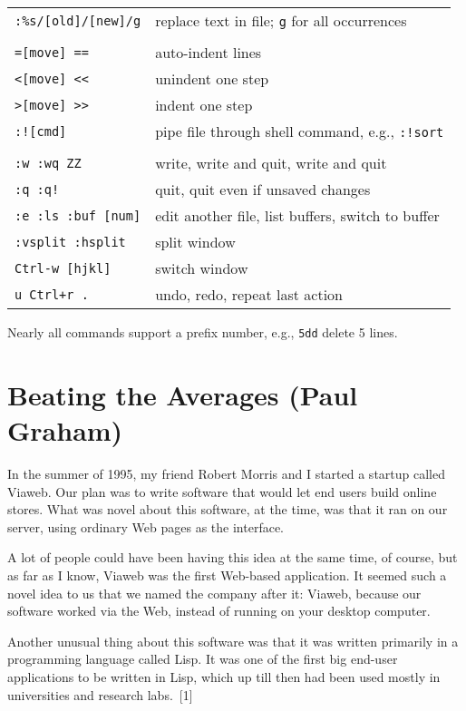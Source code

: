 \documentclass[10pt,twoside,openright]{memoir}
\begin{document}
{\begin{tabular}{ll}
\texttt{:\%s/[old]/[new]/g} & replace text in file; \texttt{g} for all occurrences \\
& \\
\texttt{=[move] ==} & auto-indent lines \\
\texttt{<[move] <{}<} & unindent one step \\
\texttt{>[move] >{}>} & indent one step \\
\texttt{:![cmd]} & pipe file through shell command, e.g., \texttt{:!sort} \\
& \\
\texttt{:w :wq ZZ} & write, write and quit, write and quit \\
\texttt{:q :q!} & quit, quit even if unsaved changes \\
\texttt{:e :ls :buf [num]} & edit another file, list buffers, switch to buffer \\
\texttt{:vsplit :hsplit} & split window \\
\texttt{Ctrl-w [hjkl]} & switch window \\
\texttt{u Ctrl+r .} & undo, redo, repeat last action \\
\end{tabular}

\vskip 0.1in
\noindent
Nearly all commands support a prefix number, e.g., \texttt{5dd} delete 5 lines.
}


\chapter{Beating the Averages (Paul Graham)}

In the summer of 1995, my friend Robert Morris and I started a startup called Viaweb. Our plan was to write software that would let end users build online stores. What was novel about this software, at the time, was that it ran on our server, using ordinary Web pages as the interface.

A lot of people could have been having this idea at the same time, of course, but as far as I know, Viaweb was the first Web-based application. It seemed such a novel idea to us that we named the company after it: Viaweb, because our software worked via the Web, instead of running on your desktop computer.

Another unusual thing about this software was that it was written primarily in a programming language called Lisp. It was one of the first big end-user applications to be written in Lisp, which up till then had been used mostly in universities and research labs.~[1]
\end{document}

